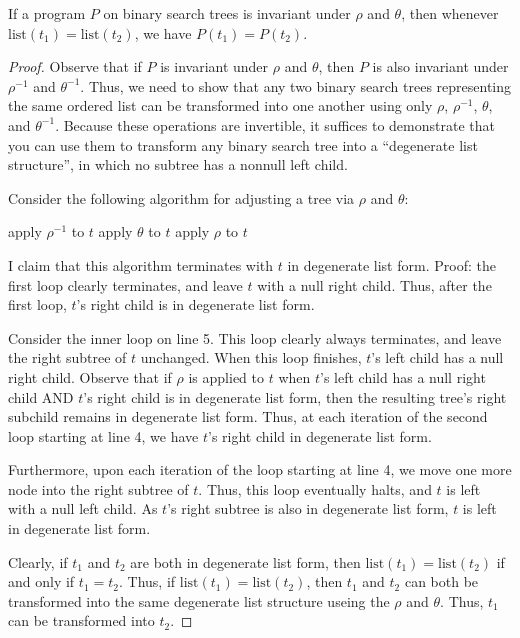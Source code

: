 \documentclass{llncs}
\begin{document}
\begin{theorem}
  If a program $P$ on binary search trees is invariant under $\rho$
  and $\theta$, then whenever $\mathrm{list}(t_1) = \mathrm{list}(t_2)$,
  we have $P(t_1) = P(t_2)$.
\end{theorem}
\begin{proof}
  Observe that if $P$ is invariant under $\rho$ and $\theta$,
  then $P$ is also invariant under $\rho^{-1}$ and $\theta^{-1}$.
  Thus, we need to show that any two binary search trees representing the same
  ordered list can be transformed into one another using only $\rho$,
  $\rho^{-1}$, $\theta$, and $\theta^{-1}$.
  Because these operations are invertible, it suffices to demonstrate that you
  can use them to transform any binary search tree into a ``degenerate list
  structure'', in which no subtree has a nonnull left child.

  Consider the following algorithm for adjusting a tree via $\rho$ and $\theta$:
  \begin{algorithm}[H]
    \begin{algorithmic}[1]
        \State apply $\rho^{-1}$ to $t$
      \EndWhile
          \State apply $\theta$ to $t$
        \EndWhile
        \State apply $\rho$ to $t$
      \EndWhile
      \EndFunction
    \end{algorithmic}
  \end{algorithm}

  I claim that this algorithm terminates with $t$ in degenerate list form.
  Proof: the first loop clearly terminates, and leave $t$ with a null right
  child. Thus, after the first loop, $t$'s right child is in degenerate list
  form.

  Consider the inner loop on line 5. This loop clearly always terminates,
  and leave the right subtree of $t$ unchanged.
  When this loop finishes, $t$'s left child has a null right child.
  Observe that if $\rho$ is applied to $t$ when $t$'s left child
  has a null right child AND $t$'s right child is in degenerate list form,
  then the resulting tree's right subchild remains in degenerate list form.
  Thus, at each iteration of the second loop starting at line 4,
  we have $t$'s right child in degenerate list form.

  Furthermore, upon each iteration of the loop starting at line 4,
  we move one more node into the right subtree of $t$.
  Thus, this loop eventually halts, and $t$ is left with a null left child.
  As $t$'s right subtree is also in degenerate list form,
  $t$ is left in degenerate list form.

  Clearly, if $t_1$ and $t_2$ are both in degenerate list form,
  then $\mathrm{list}(t_1) = \mathrm{list}(t_2)$ if and only if $t_1 = t_2$.
  Thus, if $\mathrm{list}(t_1) = \mathrm{list}(t_2)$, then $t_1$ and $t_2$
  can both be transformed into the same degenerate list structure
  useing the $\rho$ and $\theta$.
  Thus, $t_1$ can be transformed into $t_2$.

\end{proof}
\end{document}
